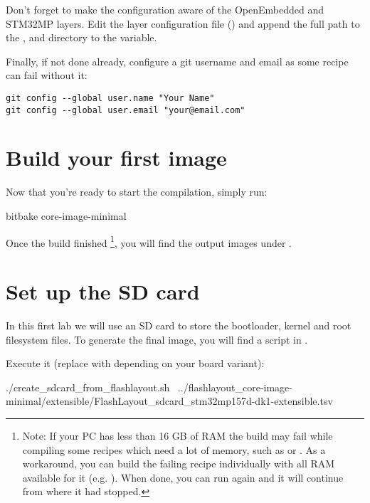 Don't forget to make the configuration aware of the OpenEmbedded and
STM32MP layers. Edit the layer configuration file
() and append the full path to the
,  and  directory to the
 variable.

Finally, if not done already, configure a git username and email as some recipe
can fail without it:
\begin{verbatim}
git config --global user.name "Your Name"
git config --global user.email "your@email.com"
\end{verbatim}

\section{Build your first image}

Now that you're ready to start the compilation, simply run:
\begin{bashinput}
bitbake core-image-minimal
\end{bashinput}

Once the build finished%
%
\footnote{Note: If your PC has less than 16 GB of
RAM the build may fail while compiling some recipes which need a lot of
memory, such as  or . As a
workaround, you can build the failing recipe individually with all RAM
available for it (e.g. ). When done, you can
run  again and it will continue from where
it had stopped.},
%
you will find the output images under
.

\section{Set up the SD card}

In this first lab we will use an SD card to store the bootloader, kernel and
root filesystem files. To generate the final image, you will find a script in
.

Execute it (replace  with  depending on your board variant):
\begin{bashinput}
./create_sdcard_from_flashlayout.sh \
  ../flashlayout_core-image-minimal/extensible/FlashLayout_sdcard_stm32mp157d-dk1-extensible.tsv
\end{bashinput}

